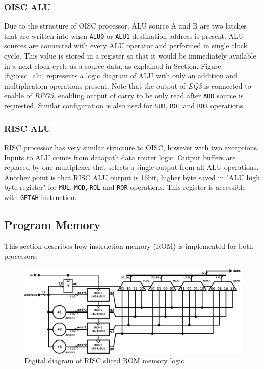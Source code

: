 \subsubsection{OISC ALU}
Due to the structure of OISC processor, ALU source A and B are two latches that are written into when \texttt{ALU0} or \texttt{ALU1} destination address is present. ALU sources are connected with every ALU operator and performed in single clock cycle. This value is stored in a register so that it would be immediately available in a next clock cycle as a source data, as explained in  Section. Figure \ref{fig:oisc_alu} represents a logic diagram of ALU with only an addition and multiplication operations present. Note that the output of \textit{EQ3} is connected to enable of \textit{REG3}, enabling output of carry to be only read after \texttt{ADD} source is requested. Similar configuration is also used for \texttt{SUB}, \texttt{ROL} and \texttt{ROR} operations.

\subsubsection{RISC ALU}
RISC processor has very similar structure to OISC, however with two exceptions. Inputs to ALU comes from datapath data router logic. Output buffers are replaced by one multiplexer that selects a single output from all ALU operations. Another point is that RISC ALU output is 16bit, higher byte saved in "ALU high byte register" for \texttt{MUL}, \texttt{MOD}, \texttt{ROL} and \texttt{ROR} operations. This register is accessible with \texttt{GETAH} instruction.

\subsection{Program Memory}\label{subsec:memory}
This section describes how instruction memory (ROM) is implemented for both processors.

\begin{figure}[b]
	\centering
	\includegraphics[width=\linewidth]{../resources/risc_mem.eps}
	\caption{Digital diagram of RISC sliced ROM memory logic}
	\label{fig:risc_mem}
\end{figure}

